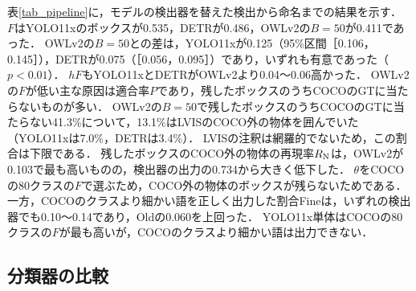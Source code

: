 表\ref{tab_pipeline}に，モデルの検出器を替えた検出から命名までの結果を示す．
$ F $はYOLO11xのボックスが0.535，DETRが0.486，OWLv2の$ B = 50 $が0.411であった．
OWLv2の$ B = 50 $との差は，YOLO11xが0.125（95\%区間［0.106，0.145］），DETRが0.075（［0.056，0.095］）であり，いずれも有意であった（$ p < 0.01 $）．
$ hF $もYOLO11xとDETRがOWLv2より0.04〜0.06高かった．
OWLv2の$ F $が低い主な原因は適合率$ P $であり，残したボックスのうちCOCOのGTに当たらないものが多い．
OWLv2の$ B = 50 $で残したボックスのうちCOCOのGTに当たらない41.3\%について，13.1\%はLVISのCOCO外の物体を囲んでいた（YOLO11xは7.0\%，DETRは3.4\%）．
LVISの注釈は網羅的でないため，この割合は下限である．
残したボックスのCOCO外の物体の再現率$ R_{\rm N} $は，OWLv2が0.103で最も高いものの，検出器の出力の0.734から大きく低下した．
$ \theta $をCOCOの80クラスの$ F $で選ぶため，COCO外の物体のボックスが残らないためである．
一方，COCOのクラスより細かい語を正しく出力した割合Fineは，いずれの検出器でも0.10〜0.14であり，Oldの0.060を上回った．
YOLO11x単体はCOCOの80クラスの$ F $が最も高いが，COCOのクラスより細かい語は出力できない．

\subsection{分類器の比較}
\begin{table}[t]
\centering
\caption{分類器の比較（テスト用の画像）．GTのボックスの列は検出の影響を除いた値であり，Top-1とTop-5はCOCOの80クラスの正解率，$ hF $は部分木の確率の合計による命名の階層的F値である（--：未評価）．右の4列は各検出器と組み合わせた場合の$ F $（COCOの80クラスのF値）である．}
\label{tab_classifier}
\setlength{\tabcolsep}{2.5pt}
\end{table}

